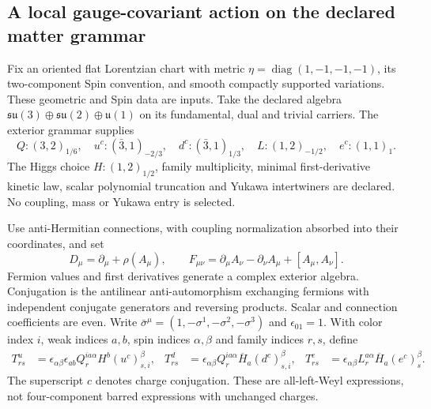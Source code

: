 \subsection{A local gauge-covariant action on the declared matter grammar}
\label{sec:local-sm-jet-action}

Fix an oriented flat Lorentzian chart with metric
$\eta=\operatorname{diag}(1,-1,-1,-1)$, its two-component Spin convention,
and smooth compactly supported variations. These geometric and Spin data
are inputs. Take the declared algebra
$\mathfrak{su}(3)\oplus\mathfrak{su}(2)\oplus\mathfrak{u}(1)$ on its
fundamental, dual and trivial carriers. The exterior grammar supplies
\[
 Q:(3,2)_{1/6},\quad u^c:(\bar3,1)_{-2/3},\quad
 d^c:(\bar3,1)_{1/3},\quad L:(1,2)_{-1/2},\quad e^c:(1,1)_1.
\]
The Higgs choice $H:(1,2)_{1/2}$, family multiplicity, minimal
first-derivative kinetic law, scalar polynomial truncation and Yukawa
intertwiners are declared. No coupling, mass or Yukawa entry is selected.

Use anti-Hermitian connections, with coupling normalization absorbed into
their coordinates, and set
\begin{equation}
 D_\mu=\partial_\mu+\rho(A_\mu),\qquad
 F_{\mu\nu}=\partial_\mu A_\nu-\partial_\nu A_\mu+[A_\mu,A_\nu].
 \label{eq:local-sm-covariant-jets}
\end{equation}
Fermion values and first derivatives generate a complex exterior algebra.
Conjugation is the antilinear anti-automorphism exchanging fermions with
independent conjugate generators and reversing products. Scalar and
connection coefficients are even. Write
$\bar\sigma^\mu=(1,-\sigma^1,-\sigma^2,-\sigma^3)$ and $\epsilon_{01}=1$.
With color index $i$, weak indices $a,b$, spin indices $\alpha,\beta$ and
family indices $r,s$, define
\begin{align}
 T^u_{rs}&=\epsilon_{\alpha\beta}\epsilon_{ab}
       Q^{ia\alpha}_r H^b (u^c)^{\beta}_{s,i},&
 T^d_{rs}&=\epsilon_{\alpha\beta}
       Q^{ia\alpha}_r\overline H_a (d^c)^{\beta}_{s,i},&
 T^e_{rs}&=\epsilon_{\alpha\beta}
       L^{a\alpha}_r\overline H_a(e^c)^\beta_s .
 \label{eq:local-sm-grassmann-yukawa}
\end{align}
The superscript $c$ denotes charge conjugation. These are all-left-Weyl
expressions, not four-component barred expressions with unchanged charges.

